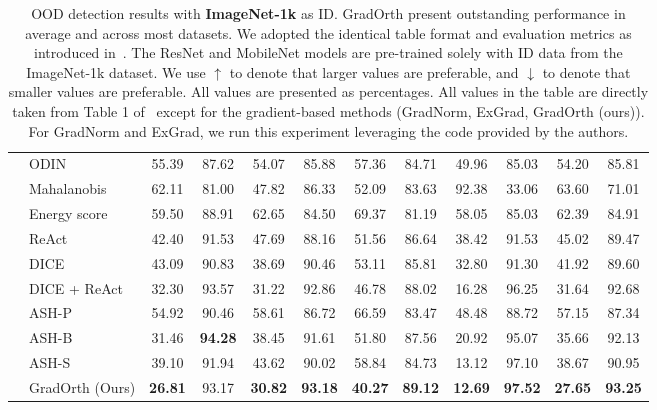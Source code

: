 \documentclass{article}
\begin{document}
\begin{table}[hbt!]
{\begin{tabular}{|c| c| c| c| c| c| c| c| c| c| c| c|}
& \multicolumn{1}{l|}{ODIN} & 55.39 & 87.62 & 54.07 & 85.88 & 57.36 & 84.71 & 49.96 & 85.03 & 54.20 & 85.81 \\
& \multicolumn{1}{l|}{Mahalanobis} & 62.11 & 81.00 & 47.82 & 86.33 & 52.09 & 83.63 & 92.38 & 33.06 & 63.60 & 71.01 \\
& \multicolumn{1}{l|}{Energy score} & 59.50 & 88.91 & 62.65 & 84.50 & 69.37 & 81.19 & 58.05 & 85.03 & 62.39 & 84.91 \\
& \multicolumn{1}{l|}{ReAct} & 42.40 & 91.53 & 47.69 & 88.16 & 51.56 & 86.64 & 38.42 & 91.53 & 45.02 & 89.47 \\
& \multicolumn{1}{l|}{DICE} & 43.09 &  90.83 & 38.69 & 90.46 & 53.11 & 85.81 & 32.80 & 91.30 & 41.92 & 89.60 \\
& \multicolumn{1}{l|}{DICE + ReAct} & 32.30 & 93.57 & 31.22 & 92.86 & 46.78 & 88.02 & 16.28 & 96.25 & 31.64 & 92.68 \\

& \multicolumn{1}{l|}{ASH-P} & 54.92 & 90.46 & 58.61 & 86.72 & 66.59 & 83.47 & 48.48 & 88.72 & 57.15 & 87.34 \\
 & \multicolumn{1}{l|}{ASH-B} & 31.46& \textbf{94.28} & 38.45 & 91.61 & 51.80 & 87.56 & 20.92 & 95.07 & 35.66 & 92.13\\
 & \multicolumn{1}{l|}{ASH-S} & 39.10 & 91.94 & 43.62 & 90.02 & 58.84 & 84.73 & 13.12 & 97.10 & 38.67 & 90.95 \\
& \multicolumn{1}{l|}{GradOrth (Ours)} & \textbf{26.81} & 93.17 & \textbf{30.82} & \textbf{93.18} & \textbf{40.27} & \textbf{89.12} & \textbf{12.69} & \textbf{97.52} & \textbf{27.65} & \textbf{93.25} \\
\bottomrule
\end{tabular}}

\caption{ OOD detection results with \textbf{ImageNet-1k} as ID. GradOrth present outstanding performance in average and across most datasets. We adopted the identical table format and evaluation metrics as introduced in~\cite {react, djurisic2022extremely}. The ResNet and MobileNet models are pre-trained solely with ID data from the ImageNet-1k dataset. We use $\uparrow$ to denote that larger values are preferable, and $\downarrow$ to denote that smaller values are preferable. All values are presented as percentages. All values in the table are directly taken from Table 1 of~\cite{djurisic2022extremely} except for the gradient-based methods (GradNorm, ExGrad, GradOrth (ours)). For GradNorm and ExGrad, we run this experiment leveraging the code provided by the authors. 
}
\label{tab:imagenet}
\vspace{-4mm}
\end{table}
\end{document}
